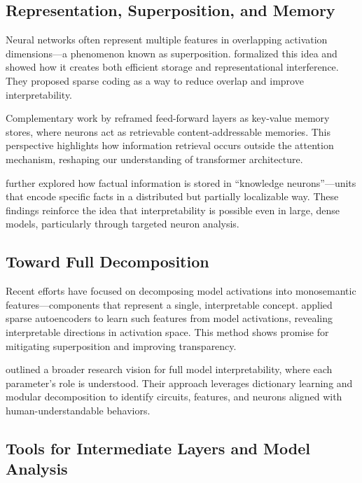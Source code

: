\subsection{Representation, Superposition, and Memory}

Neural networks often represent multiple features in overlapping activation dimensions—a phenomenon known as superposition. \citet{elhage2022toy} formalized this idea and showed how it creates both efficient storage and representational interference. They proposed sparse coding as a way to reduce overlap and improve interpretability.

Complementary work by \citet{geva2021memory} reframed feed-forward layers as key-value memory stores, where neurons act as retrievable content-addressable memories. This perspective highlights how information retrieval occurs outside the attention mechanism, reshaping our understanding of transformer architecture.

\citet{dai2022knowledge} further explored how factual information is stored in “knowledge neurons”—units that encode specific facts in a distributed but partially localizable way. These findings reinforce the idea that interpretability is possible even in large, dense models, particularly through targeted neuron analysis.

\subsection{Toward Full Decomposition}

Recent efforts have focused on decomposing model activations into monosemantic features—components that represent a single, interpretable concept. \citet{bircken2023monosemanticity} applied sparse autoencoders to learn such features from model activations, revealing interpretable directions in activation space. This method shows promise for mitigating superposition and improving transparency.

\citet{anthropic2023components} outlined a broader research vision for full model interpretability, where each parameter's role is understood. Their approach leverages dictionary learning and modular decomposition to identify circuits, features, and neurons aligned with human-understandable behaviors.

\subsection{Tools for Intermediate Layers and Model Analysis}

